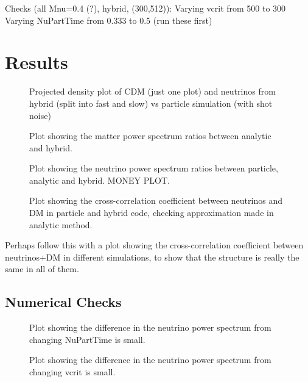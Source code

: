 \documentclass[useAMS, usenatbib]{mnras}
\begin{document}
Checks (all Mnu=0.4 (?), hybrid, (300,512)):
Varying vcrit from 500 to 300
Varying NuPartTime from 0.333 to 0.5
(run these first)


\section{Results}
\label{sec:results}

\begin{figure}
  \caption{Projected density plot of CDM (just one plot) and neutrinos from hybrid (split into fast and slow) vs particle simulation (with shot noise)}
  \label{fig:density_plot}
\end{figure}

\begin{figure}
  \caption{Plot showing the matter power spectrum ratios between analytic and hybrid. }
  \label{fig:matter_power}
\end{figure}

\begin{figure}
  \caption{Plot showing the neutrino power spectrum ratios between particle, analytic and hybrid.
  MONEY PLOT.}
  \label{fig:neutrino_power}
\end{figure}

\begin{figure}
  \caption{Plot showing the cross-correlation coefficient between neutrinos
  and DM in particle and hybrid code, checking approximation made in analytic method.}
  \label{fig:cross-corr}
\end{figure}

Perhaps follow this with a plot showing the cross-correlation coefficient between neutrinos+DM
in different simulations, to show that the structure is really the same in all of them.


\subsection{Numerical Checks}

\begin{figure}
  \caption{Plot showing the difference in the neutrino power spectrum from changing NuPartTime is small. }
  \label{fig:nuparttime}
\end{figure}

\begin{figure}
  \caption{Plot showing the difference in the neutrino power spectrum from changing vcrit is small. }
  \label{fig:vcrit}
\end{figure}
\end{document}
